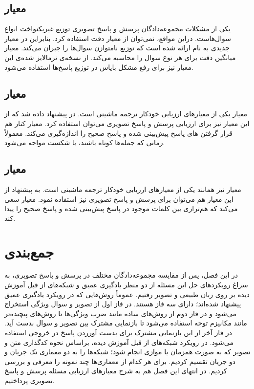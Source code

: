 \subsection{ معیار }

		یکی از مشکلات مجموعه‌دادگان پرسش و پاسخ تصویری توزیع غیریکنواخت انواع سوال‌هاست. دراین مواقع، نمی‌توان از معیار دقت استفاده کرد. بنابراین  در 
	\cite{kafle2017analysis}
		 معیار جدیدی به نام 
		ارائه شده است که توزیع نامتوازن سوال‌ها را جبران می‌کند. معیار 
	میانگین دقت برای هر نوع سوال را محاسبه می‌کند. از نسخه‌ی نرمالایز شده‌ی این معیار نیز برای رفع مشکل بایاس در توزیع پاسخ‌ها استفاده می‌شود.


\subsection{معیار }
معیار
		\cite{papineni2002bleu}
		یکی از معیارهای ارزیابی خودکار ترجمه ماشینی است. در
		\cite{gurari2018vizwiz}
		 پیشنهاد داده شد که از این معیار نیز برای ارزیابی پرسش و پاسخ تصویری می‌توان استفاده کرد. معیار 
		کنار هم قرار گرفتن 
		های پاسخ پیش‌‌بینی شده و پاسخ صحیح را اندازه‌گیری می‌کند. معمولاً
	زمانی که جمله‌ها کوتاه باشند، با شکست مواجه می‌‌شود.
		


\subsection{معیار }
معیار
		\cite{denkowski2014meteor}
		نیز همانند
	یکی از معیارهای ارزیابی خودکار ترجمه ماشینی است. به پیشنهاد 
	\cite{gurari2018vizwiz}
	 از این معیار هم می‌توان برای پرسش و پاسخ تصویری نیز استفاده نمود. معیار 
		سعی می‌کند که هم‌ترازی بین کلمات موجود در پاسخ پیش‌بینی شده و پاسخ صحیح را پیدا کند.
\section{جمع‌بندی}
در این فصل، پس از مقایسه مجموعه‌دادگان مختلف در پرسش و پاسخ تصویری، به سراغ رویکرد‌های حل این مسئله از دو منظر یادگیری عمیق و شبکه‌های از قبل آموزش دیده بر روی زبان طبیعی و تصویر رفتیم. عموماً روش‌هایی که در رویکرد یادگیری عمیق پیشنهاد شده‌اند؛ دارای سه فاز هستند. در فاز اول از تصویر و سوال ویژگی استخراج می‌شود و در فاز دوم از روش‌های ساده مانند ضرب ویژگی‌ها تا روش‌های پیچیده‌تر مانند مکانیزم توجه استفاده می‌شود تا بازنمایی مشترک بین تصویر و سوال بدست آید. در فاز آخر از این بازنمایی مشترک برای بدست آورردن پاسخ در خروجی استفاده می‌شود. در رویکرد شبکه‌های از قبل آموزش دیده، براساس نحوه کدگذاری متن  و تصویر که به صورت همزمان یا موازی انجام ‌شود؛ شبکه‌‌ها را به دو معماری تک جریان و دو جریان تقسیم کردیم. برای هر کدام از معماری‌ها چند نمونه را معرفی و بررسی  کردیم. در انتهای این فصل هم به شرح معیار‌های ارزیابی مسئله پرسش و پاسخ تصویری پرداختیم.


